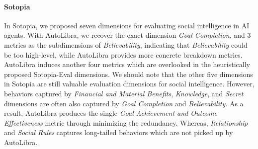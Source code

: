 \paragraph{Sotopia} In Sotopia, we \citep{zhousotopia} proposed seven dimensions for evaluating social intelligence in AI agents. With AutoLibra, we recover the exact dimension \emph{Goal Completion}, and 3 metrics as the subdimensions of \emph{Believability}, indicating that \textit{Believability} could be too high-level, while AutoLibra provides more concrete breakdown metrics. 
AutoLibra induces another four metrics which are overlooked in the heuristically proposed Sotopia-Eval dimensions. We should note that the other five dimensions in Sotopia are still valuable evaluation dimensions for social intelligence. However, behaviors captured by \emph{Financial and Material Benefits}, \emph{Knowledge}, and \emph{Secret} dimensions are often also captured by \textit{Goal Completion} and \textit{Believability}. As a result, AutoLibra produces the single \textit{Goal Achievement and Outcome Effectiveness} metric through minimizing the redundancy. Whereas, \textit{Relationship} and \textit{Social Rules} captures long-tailed behaviors which are not picked up by AutoLibra.

